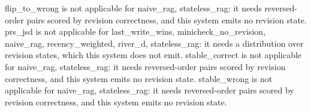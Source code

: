 \begin{table}
\footnotesize{flip\_to\_wrong is not applicable for naive\_rag, stateless\_rag: it needs reversed-order pairs scored by revision correctness, and this system emits no revision state.}
\footnotesize{prs\_jsd is not applicable for last\_write\_wins, minicheck\_no\_revision, naive\_rag, recency\_weighted, river\_d, stateless\_rag: it needs a distribution over revision states, which this system does not emit.}
\footnotesize{stable\_correct is not applicable for naive\_rag, stateless\_rag: it needs reversed-order pairs scored by revision correctness, and this system emits no revision state.}
\footnotesize{stable\_wrong is not applicable for naive\_rag, stateless\_rag: it needs reversed-order pairs scored by revision correctness, and this system emits no revision state.}
\end{table}
